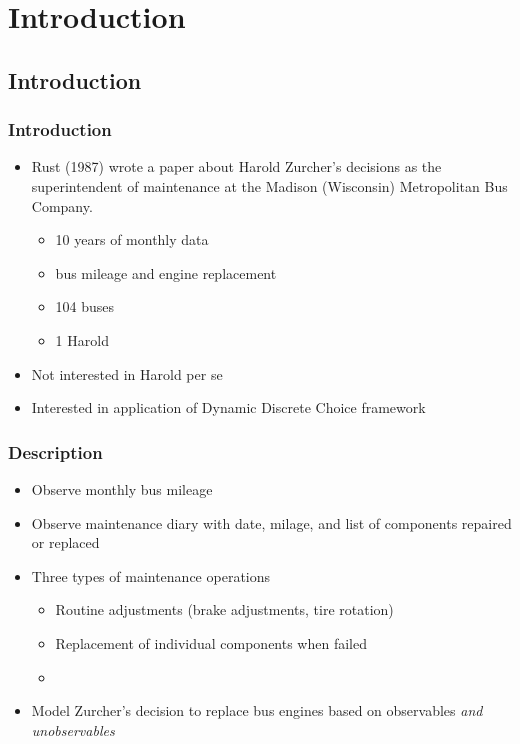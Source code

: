 \documentclass{beamer}
\date{}
\author{Trevor Gallen}
\begin{document}
\renewcommand*{\inserttotalframenumber}{\pageref{lastframe}}

\begin{frame}
\titlepage
\end{frame}


\section{Introduction}
\subsection{Introduction}
\begin{frame}
\frametitle{Introduction}
\begin{itemize}
\item Rust (1987) wrote a paper about Harold Zurcher's decisions as the superintendent 
of maintenance at the Madison (Wisconsin) Metropolitan Bus Company. 
\bigskip
\begin{itemize}
\item 10 years of monthly data 
\bigskip
\item bus mileage and engine replacement
\bigskip
\item 104 buses
\bigskip
\item 1 Harold
\bigskip
\end{itemize} 
\item<2-> Not interested in Harold per se
\bigskip
\item<3-> Interested in application of Dynamic Discrete Choice framework
\bigskip
\end{itemize}
\end{frame}


\begin{frame}
\frametitle{Description}
\begin{itemize}
\item Observe monthly bus mileage
\bigskip
\item Observe maintenance diary with date, milage, and list of components repaired or replaced
\bigskip
\item Three types of maintenance operations
\begin{itemize}
\item Routine adjustments (brake adjustments, tire rotation)
\bigskip
\item Replacement of individual components when failed
\bigskip
\item {}
\bigskip
\end{itemize}
\item Model Zurcher's decision to replace bus engines based on observables \emph{and unobservables}
\end{itemize}
\end{frame}
\end{document}
